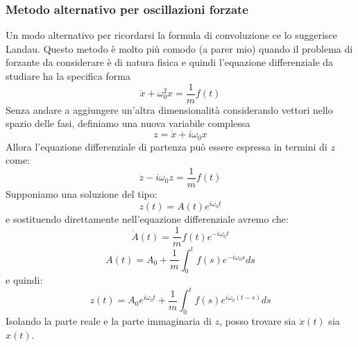 \documentclass[a4paper,openany]{article}
\begin{document}
	\subsubsection{Metodo alternativo per oscillazioni forzate}
	Un modo alternativo per ricordarsi la formula di convoluzione ce lo suggerisce Landau. Questo metodo è molto più comodo (a parer mio) quando il problema di forzante da considerare è di natura fisica e quindi l'equazione differenziale da studiare ha la specifica forma
	$$
	\ddot{x} + \omega_0^2 x = \dfrac{1}{m}f(t)
	$$
	Senza andare a aggiungere un'altra dimensionalità considerando vettori nello spazio delle fasi, definiamo una nuova variabile complessa 
	\begin{equation}\label{key}
		z = \dot{x} + i\omega_0 x
	\end{equation}
	Allora l'equazione differenziale di partenza può essere espressa in termini di $z$ come:
	\begin{equation}\label{key}
		\dot{z} - i\omega_0 z = \dfrac{1}{m}f(t)
	\end{equation}
	Supponiamo una soluzione del tipo:
	$$
	z(t) = A(t)e^{i\omega_0 t}
	$$
	e sostituendo direttamente nell'equazione differenziale avremo che:
	\begin{equation}\label{key}
		\dot{A}(t) = \dfrac{1}{m}f(t)e^{-i\omega_0 t}
	\end{equation}
	\begin{equation}\label{key}
		A(t) = A_0 + \dfrac{1}{m}\int_{0}^{t}f(s)e^{-i\omega_0 s}ds
	\end{equation}
	e quindi:
	\begin{equation}\label{key}
		z(t) = A_0e^{i\omega_0 t} + \dfrac{1}{m}\int_{0}^{t}f(s)e^{i\omega_0 (t-s)}ds
	\end{equation}
	Isolando la parte reale e la parte immaginaria di $z$, posso trovare sia $\dot{x}(t)$ sia $x(t)$.
\end{document}
